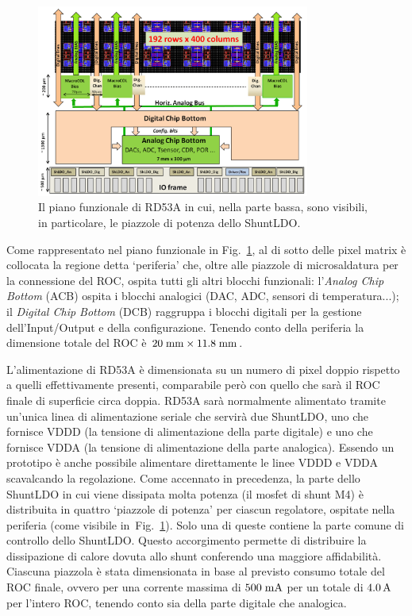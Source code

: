 \begin{figure}
\centering
\includegraphics[width=0.8\textwidth]{Immagini/RD53Apianofunzionale}
\caption{Il piano funzionale di RD53A in cui, nella parte bassa, sono visibili, in particolare, le piazzole di potenza dello ShuntLDO.}
\label{RD53AFunct}
\end{figure}
Come rappresentato nel piano funzionale in Fig.~\ref{RD53AFunct}, al di sotto delle pixel matrix \`e collocata la regione detta `periferia' che, oltre alle piazzole di microsaldatura per la connessione del ROC, ospita tutti gli altri blocchi funzionali: l'{\em Analog Chip Bottom} (ACB) ospita i blocchi analogici (DAC, ADC, sensori di temperatura...); il {\em Digital Chip Bottom} (DCB) raggruppa i blocchi digitali per la gestione dell'Input/Output e della configurazione. Tenendo conto della periferia la dimensione totale del ROC \`e $20\rm \; mm \times 11.8\rm \; mm$.

L'alimentazione di RD53A \`e dimensionata su un numero di pixel doppio rispetto a quelli effettivamente presenti, comparabile per\`o con quello che sar\`a il ROC finale di superficie circa doppia. RD53A sar\`a normalmente alimentato tramite un'unica linea di alimentazione seriale che servirà due ShuntLDO, uno che fornisce VDDD (la tensione di alimentazione della parte digitale) e uno che fornisce VDDA (la tensione di alimentazione della parte analogica). Essendo un prototipo \`e anche possibile alimentare direttamente le linee VDDD e VDDA scavalcando la regolazione.
Come accennato in precedenza, la parte dello ShuntLDO in cui viene dissipata molta potenza (il mosfet di shunt M4) \`e distribuita in quattro `piazzole di potenza' per ciascun regolatore, ospitate nella periferia (come visibile in~Fig.~\ref{RD53AFunct}). Solo una di queste contiene la parte comune di controllo dello ShuntLDO. Questo accorgimento permette di distribuire la dissipazione di calore dovuta allo shunt conferendo una maggiore affidabilità. Ciascuna piazzola \`e stata dimensionata in base al previsto consumo totale del ROC finale, ovvero per una corrente massima di $500\rm \; mA$ per un totale di $4.0\rm \, A$ per l'intero ROC, tenendo conto sia della parte digitale che analogica.

